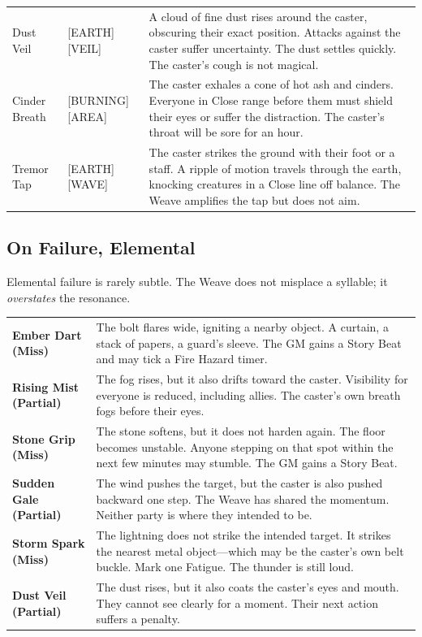 \begin{longtable}{p{} p{} p{}}
Dust Veil & [EARTH][VEIL] & A cloud of fine dust rises around the caster, obscuring their exact position. Attacks against the caster suffer uncertainty. The dust settles quickly. The caster's cough is not magical. \\
Cinder Breath & [BURNING][AREA] & The caster exhales a cone of hot ash and cinders. Everyone in Close range before them must shield their eyes or suffer the distraction. The caster's throat will be sore for an hour. \\
Tremor Tap & [EARTH][WAVE] & The caster strikes the ground with their foot or a staff. A ripple of motion travels through the earth, knocking creatures in a Close line off balance. The Weave amplifies the tap but does not aim. \\
\hline
\end{longtable}

\subsection{On Failure, Elemental}

Elemental failure is rarely subtle. The Weave does not misplace a syllable; it \emph{overstates} the resonance.

\begin{tabular}{p{} p{}}
\textbf{Ember Dart (Miss)} & The bolt flares wide, igniting a nearby object. A curtain, a stack of papers, a guard's sleeve. The GM gains a Story Beat and may tick a Fire Hazard timer. \\
\textbf{Rising Mist (Partial)} & The fog rises, but it also drifts toward the caster. Visibility for everyone is reduced, including allies. The caster's own breath fogs before their eyes. \\
\textbf{Stone Grip (Miss)} & The stone softens, but it does not harden again. The floor becomes unstable. Anyone stepping on that spot within the next few minutes may stumble. The GM gains a Story Beat. \\
\textbf{Sudden Gale (Partial)} & The wind pushes the target, but the caster is also pushed backward one step. The Weave has shared the momentum. Neither party is where they intended to be. \\
\textbf{Storm Spark (Miss)} & The lightning does not strike the intended target. It strikes the nearest metal object---which may be the caster's own belt buckle. Mark one Fatigue. The thunder is still loud. \\
\textbf{Dust Veil (Partial)} & The dust rises, but it also coats the caster's eyes and mouth. They cannot see clearly for a moment. Their next action suffers a penalty. \\
\end{tabular}

